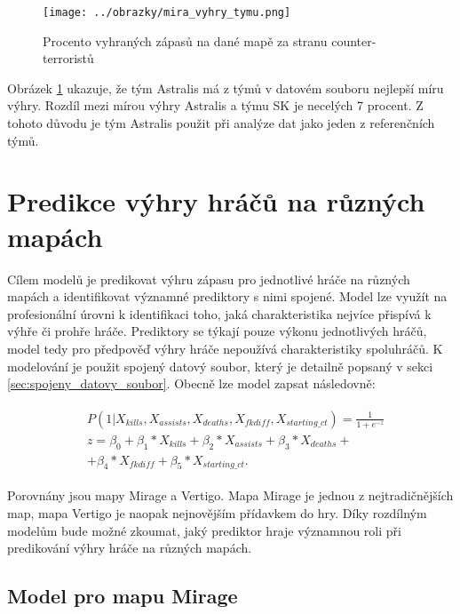 \begin{figure}[H]
    \centering
    \texttt{[image: ../obrazky/mira\_vyhry\_tymu.png]}
    \caption{Procento vyhraných zápasů na dané mapě za stranu counter-terroristů} 
    \label{fig:mira_vyhry_tymu}
\end{figure}

Obrázek \ref{fig:mira_vyhry_tymu} ukazuje, že tým Astralis má z týmů v datovém souboru nejlepší míru výhry. Rozdíl mezi mírou výhry Astralis a týmu SK je necelých 7 procent.
Z tohoto důvodu je tým Astralis použit při analýze dat jako jeden z referenčních týmů.

\newpage
\section{Predikce výhry hráčů na různých mapách}
Cílem modelů je predikovat výhru zápasu pro jednotlivé hráče na různých mapách a identifikovat významné prediktory s nimi spojené. Model lze využít na profesionální
úrovni k identifikaci toho, jaká charakteristika nejvíce přispívá k výhře či prohře hráče. Prediktory se týkají pouze výkonu jednotlivých
hráčů, model tedy pro předpověď výhry hráče nepoužívá charakteristiky spoluhráčů. K modelování je použit spojený datový soubor, který je detailně popsaný v
sekci \ref{sec:spojeny_datovy_soubor}. Obecně lze model zapsat následovně:

\begin{align}
    \begin{split}
        &P(1 | X_{kills}, X_{assists}, X_{deaths}, X_{fkdiff}, X_{starting\_ct}) = \frac{1}{1 + e^{-z}} \\
        &z = \beta_0 + \beta_1*X_{kills} + \beta_2*X_{assists} + \beta_3*X_{deaths} + \\
        &+ \beta_4*X_{fkdiff} + \beta_5*X_{starting\_ct}.
    \end{split}
\end{align}

Porovnány jsou mapy Mirage a Vertigo. Mapa Mirage je jednou z nejtradičnějších map, mapa Vertigo je naopak nejnovějším přídavkem do hry.
Díky rozdílným modelům bude možné zkoumat, jaký prediktor hraje významnou roli při predikování výhry hráče na různých mapách.

\subsection{Model pro mapu Mirage}



